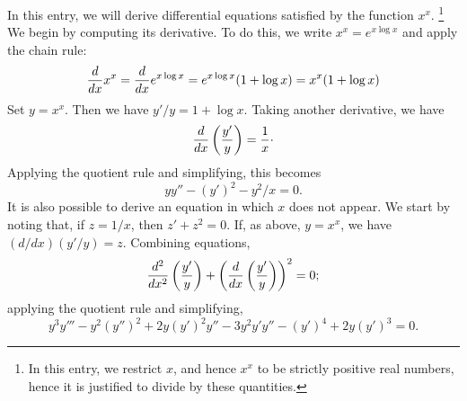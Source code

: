 \documentclass[12pt]{article}
\begin{document}
In this entry, we will derive differential equations satisfied by the function $x^x$.
\footnote{In this entry, we restrict $x$, and hence $x^x$ to be strictly positive
real numbers, hence it is justified to divide by these quantities.}
We begin by computing its derivative.  To do this, we write $x^x = e^{x \log x}$ and
apply the chain rule:
\[
{d \over dx} x^x =
{d \over dx} e^{x \log x} =
e^{x \log x} (1 + \log x) =
x^x (1 + \log x)
\]
Set $y = x^x$.  Then we have $y'/y = 1 + \log x$.  Taking
another derivative, we have
\[
{d \over dx} \left( {y' \over y} \right) = {1 \over x} \cdot
\]
Applying the quotient rule and simplifying, this becomes
\[
yy'' - (y')^2 - y^2/x = 0 .
\]
It is also possible to derive an equation in which $x$ does not appear.
We start by noting that, if $z = 1/x$, then $z' + z^2 = 0$.  If, as
above, $y = x^x$, we have $(d/dx) (y'/y) = z$.  Combining equations,
\[
{d^2 \over dx^2} \left( {y' \over y} \right) +
\left( {d \over dx} \left( {y' \over y} \right) \right)^2 = 0 ;
\]
applying the quotient rule and simplifying,
\[
y^3 y''' - y^2 (y'')^2 + 2 y (y')^2 y'' - 3 y^2 y' y'' - (y')^4 + 2 y (y')^3 = 0 .
\]
\end{document}
